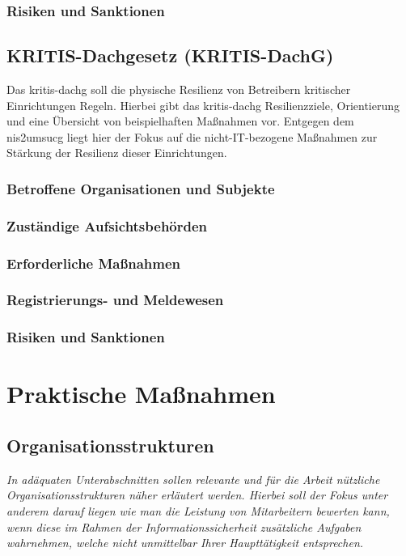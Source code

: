 \documentclass[11pt,a4paper,hidelinks]{article}   %
\begin{document}
            \subsubsection{Risiken und Sanktionen}

        \subsection{KRITIS-Dachgesetz (KRITIS-DachG)}
        Das \gls{kritis-dachg} soll die physische Resilienz von Betreibern kritischer Einrichtungen Regeln. Hierbei gibt das \gls{kritis-dachg} Resilienzziele, Orientierung und eine Übersicht von beispielhaften Maßnahmen vor. Entgegen dem \gls{nis2umsucg} liegt hier der Fokus auf die nicht-IT-bezogene Maßnahmen zur Stärkung der Resilienz dieser Einrichtungen.
            \subsubsection{Betroffene Organisationen und Subjekte}
            \subsubsection{Zuständige Aufsichtsbehörden}
            \subsubsection{Erforderliche Maßnahmen}
            \subsubsection{Registrierungs- und Meldewesen}
            \subsubsection{Risiken und Sanktionen}



    \newpage
    \section{Praktische Maßnahmen}\label{sec:ParktischeMaßnahmen}
        \subsection{Organisationsstrukturen}
            \emph{In adäquaten Unterabschnitten sollen relevante und für die Arbeit nützliche Organisationsstrukturen näher erläutert werden. Hierbei soll der Fokus unter anderem darauf liegen wie man die Leistung von Mitarbeitern bewerten kann, wenn diese im Rahmen der Informationssicherheit zusätzliche Aufgaben wahrnehmen, welche nicht unmittelbar Ihrer Haupttätigkeit entsprechen.}
\end{document}
